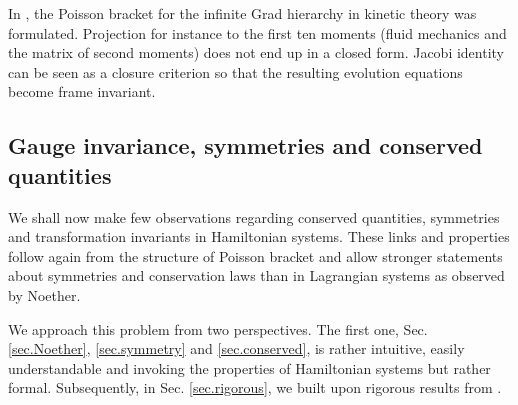\documentclass[
10pt, %
a4paper, %
oneside, %
headinclude,footinclude, %
BCOR5mm, %
]{scrartcl}
\newcommand{\IP}[1]{{\color{Red}IP:\ \ #1}}
\newcommand{\VK}[1]{{\color{Cyan}VK:\ \ #1}}
\begin{document}
In \cite{Miroslav-Grad}, the Poisson bracket for the infinite Grad hierarchy in 
kinetic theory was formulated. Projection for instance to the first ten moments 
(fluid mechanics and the matrix of second moments) does not end up in a closed 
form. Jacobi identity can be seen as a closure criterion so that the resulting 
evolution equations become frame invariant. 

\subsection{Gauge invariance, symmetries and conserved quantities}\label{sec.gauge}

We shall now make few observations regarding conserved quantities, symmetries and transformation invariants in Hamiltonian systems. These links and properties follow again from the structure of Poisson bracket and allow stronger statements about symmetries and conservation laws than in Lagrangian systems as observed by Noether.

We approach this problem from two perspectives. The first one, Sec. \ref{sec.Noether}, \ref{sec.symmetry} and \ref{sec.conserved}, is rather 
intuitive, easily understandable and invoking the properties of Hamiltonian 
systems but rather formal.
Subsequently, in Sec. \ref{sec.rigorous}, we built upon rigorous results from \cite{olver2000applications}.
\end{document}
